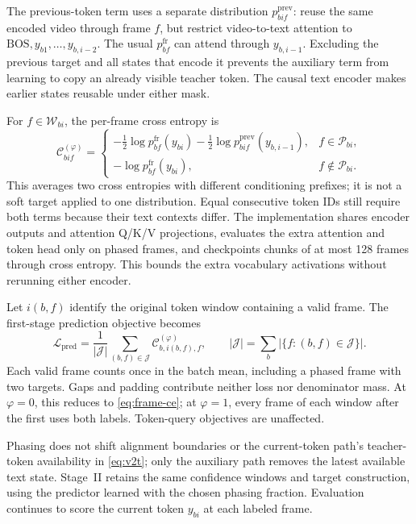 \documentclass[11pt,a4paper]{article}
\newcommand{\BOS}{\mathrm{BOS}}
\numberwithin{equation}{section}
\begin{document}
The previous-token term uses a separate distribution
$p_{bif}^{\mathrm{prev}}$: reuse the same encoded video through frame $f$,
but restrict video-to-text attention to $\BOS,y_{b1},\ldots,y_{b,i-2}$.
The usual $p_{bf}^{\mathrm{fr}}$ can attend through $y_{b,i-1}$.
Excluding the previous target and all states that encode it prevents the
auxiliary term from learning to copy an already visible teacher token.
The causal text encoder makes earlier states reusable under either mask.

For $f\in\mathcal W_{bi}$, the per-frame cross entropy is
\begin{equation}
\mathcal C_{bif}^{(\varphi)}=
\begin{cases}
-\tfrac12\log p_{bf}^{\mathrm{fr}}(y_{bi})
-\tfrac12\log p_{bif}^{\mathrm{prev}}(y_{b,i-1}),&f\in\mathcal P_{bi},\\
-\log p_{bf}^{\mathrm{fr}}(y_{bi}),&f\notin\mathcal P_{bi}.
\end{cases}
\label{eq:phased-frame-ce}
\end{equation}
This averages two cross entropies with different conditioning prefixes;
it is not a soft target applied to one distribution. Equal consecutive
token IDs still require both terms because their text contexts differ.
The implementation shares encoder outputs and attention Q/K/V projections,
evaluates the extra attention and token head only on phased frames, and
checkpoints chunks of at most 128 frames through cross entropy. This bounds
the extra vocabulary activations without rerunning either encoder.

Let $i(b,f)$ identify the original token window containing a valid
frame. The first-stage prediction objective becomes
\begin{equation}
\mathcal L_{\mathrm{pred}}
=\frac{1}{|\mathcal J|}\sum_{(b,f)\in\mathcal J}
 \mathcal C_{b,i(b,f),f}^{(\varphi)},\qquad
|\mathcal J|=\sum_b|\{f:(b,f)\in\mathcal J\}|.
\label{eq:phased-batch-ce}
\end{equation}
Each valid frame counts once in the batch mean, including a phased
frame with two targets. Gaps and padding contribute neither loss nor
denominator mass. At $\varphi=0$, this reduces to
\eqref{eq:frame-ce}; at $\varphi=1$, every frame of each window after
the first uses both labels. Token-query objectives are unaffected.

Phasing does not shift alignment boundaries or the current-token path's
teacher-token availability in \eqref{eq:v2t}; only the auxiliary path
removes the latest available text state. Stage~II retains the same
confidence windows and target construction, using the predictor learned
with the chosen phasing fraction. Evaluation continues to score the
current token $y_{bi}$ at each labeled frame.
\end{document}
